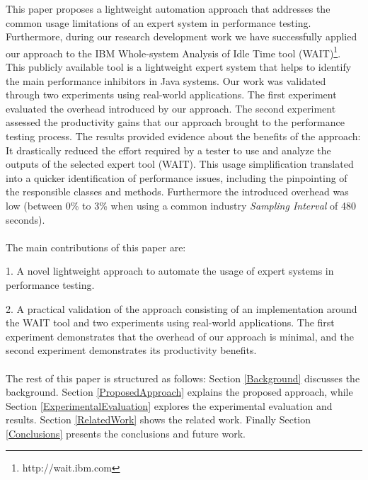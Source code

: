 \documentclass[runningheads,a4paper]{llncs}
\newcommand{\myspaceM}{-7.6pt}
\begin{document}
This paper proposes a lightweight automation approach that addresses the common
usage limitations of an expert system in performance testing. Furthermore,
during our research development work we have successfully applied our approach
to the IBM Whole-system Analysis of Idle Time tool (WAIT)\footnote{http://wait.ibm.com}.
This publicly available tool is a lightweight expert system that helps to
identify the main performance inhibitors %
in Java systems. Our work
was validated through two experiments using real-world applications. The first
experiment evaluated the overhead introduced by our approach. The second
experiment assessed the productivity gains that our approach brought to the
performance testing process. The results provided evidence about the benefits 
of the approach: It drastically reduced the effort required by a tester to use 
and analyze the outputs of the selected expert tool (WAIT). This usage simplification 
translated into a quicker identification of performance issues, including the pinpointing 
of the responsible classes and methods. Furthermore the introduced overhead was
low (between 0\% to 3\% when using a common industry \emph{Sampling Interval} of 480 seconds).
\\\\
The main contributions of this paper are: 

1. A novel lightweight approach to automate the usage of expert systems in
performance testing.

2. A practical validation of the approach consisting of an implementation
around the WAIT tool and two experiments using real-world applications. The
first experiment demonstrates that the overhead of our approach is minimal, and the
second experiment demonstrates its productivity benefits.
\\\\

The rest of this paper is structured as follows: Section \ref{Background}
discusses the background. Section \ref{ProposedApproach} explains the proposed
approach, while Section \ref{ExperimentalEvaluation} explores the experimental 
evaluation and results. Section \ref{RelatedWork} shows the related work.
Finally Section \ref{Conclusions} presents the conclusions and future work.


\vspace{\myspaceM{}}
\end{document}
